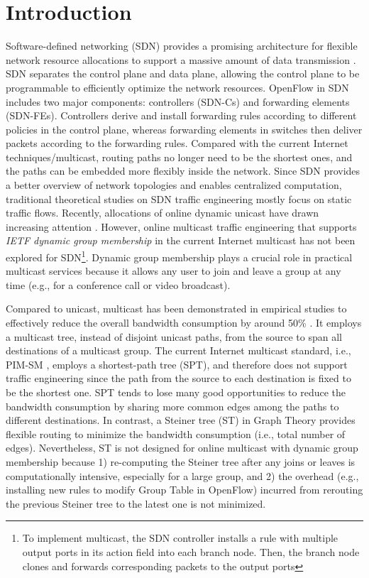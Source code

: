 \documentclass[10pt, conference, letterpaper]{IEEEtran}
\theoremstyle{definition}
\begin{document}
\section{Introduction}
Software-defined networking (SDN) provides a promising architecture for flexible network resource allocations to support a massive amount of data transmission \cite{OpenFlow}. SDN separates the control plane and data plane, allowing the control plane to be programmable to efficiently optimize the network resources. OpenFlow \cite{OpenFlow} in SDN includes two major components: controllers (SDN-Cs) and forwarding elements (SDN-FEs). Controllers derive and install forwarding rules according to different policies in the control
plane, whereas {forwarding elements in switches} then deliver packets according to the forwarding rules. Compared with the current Internet techniques/multicast, routing paths no longer need to be the shortest ones, and the paths can be embedded more flexibly inside the network. Since SDN provides a better overview of network topologies and enables centralized computation, traditional theoretical studies on SDN traffic engineering mostly focus on static traffic flows. Recently, allocations of online dynamic unicast have drawn increasing attention \cite{DynamicRouting-SDN,2SegmentRouting}.
However, online multicast traffic engineering that supports \emph{IETF dynamic group membership} \cite{RFC2236} in the current Internet multicast has not been explored for SDN\footnote{{\color{black}To implement multicast, the SDN controller installs a rule with multiple output ports in its action field into each branch node. Then, the branch node clones and forwards corresponding packets to the output ports}}. Dynamic group membership plays a crucial role in practical multicast services because it allows any user to join and leave a group at any time (e.g., for a conference call or video broadcast).

Compared to unicast, multicast has been demonstrated in empirical studies to effectively reduce the overall bandwidth consumption by around 50\% \cite{BenefitsOfMulticast}. It employs a multicast tree, instead of disjoint unicast paths, from the source to span all destinations of a multicast group. The current Internet multicast standard, i.e., PIM-SM \cite{RFC4601}, employs a shortest-path tree (SPT), and therefore does not support traffic engineering since the path from the source to each destination is fixed to be the shortest one. SPT tends to lose many good opportunities to reduce the bandwidth consumption by sharing more common edges among the paths to different destinations. In contrast, a Steiner tree (ST) \cite{STProblems} in Graph Theory provides flexible routing to minimize the bandwidth consumption (i.e., total number of edges). 
Nevertheless, ST is not designed for online multicast with dynamic group membership because 1) re-computing the Steiner tree after any joins or leaves is computationally intensive, especially for a large group, and 2) the overhead (e.g., installing new rules to modify Group Table in OpenFlow) incurred from rerouting the previous Steiner tree to the latest one is not minimized.
\end{document}
